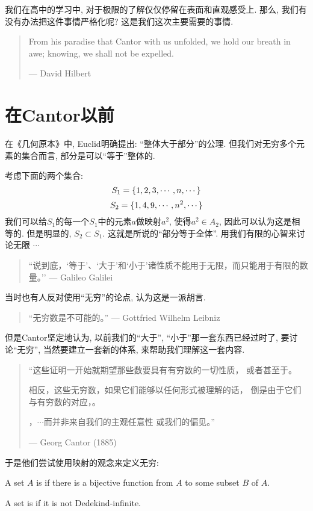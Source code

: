 我们在高中的学习中, 对于极限的了解仅仅停留在表面和直观感受上. 那么, 我们有没有办法把这件事情严格化呢? 这是我们这次主要需要的事情. 

\begin{quote}
    From his paradise that Cantor with us unfolded,
    we hold our breath in awe; knowing, we shall not be expelled.

    \hfill --- David Hilbert
\end{quote}

\section{在Cantor以前}

在《几何原本》中, Euclid明确提出: ``整体大于部分''的公理. 但我们对无穷多个元素的集合而言, 部分是可以``等于''整体的. 

考虑下面的两个集合: 
\[
S_1 = \{1, 2, 3, \cdots, n, \cdots\}
\]
\[
S_2 = \{1, 4, 9, \cdots, n^2, \cdots\}
\]
我们可以给$S_1$的每一个$S_1$中的元素$a$做映射$a^2$, 使得$a^2 \in A_2$, 因此可以认为这是相等的. 但是明显的, $S_2 \subset S_1$. 这就是所说的``部分等于全体''. 用我们有限的心智来讨论无限 $\cdots$

\begin{quote}
    ``说到底，`等于'、`大于'和`小于'诸性质不能用于无限，而只能用于有限的数量。'' 
    \hfill --- Galileo Galilei
\end{quote}

当时也有人反对使用``无穷''的论点, 认为这是一派胡言. 
\begin{quote}
    ``无穷数是不可能的。'' \hfill --- Gottfried Wilhelm Leibniz
\end{quote}

但是Cantor坚定地认为, 以前我们的``大于'', ``小于''那一套东西已经过时了, 要讨论``无穷'', 当然要建立一套新的体系, 来帮助我们理解这一套内容. 

\begin{quote}
    ``这些证明一开始就期望那些数要具有有穷数的一切性质，
    或者甚至于。

    相反，这些无穷数，如果它们能够以任何形式被理解的话，
    倒是由于它们与有穷数的对应，。

    ，$\cdots$而并非来自我们的主观任意性
    或我们的偏见。''

    \hfill --- Georg Cantor (1885)
\end{quote}

于是他们尝试使用映射的观念来定义无穷: 
\begin{definition}
    A set $A$ is 
    if there is a bijective function from $A$ to some  subset $B$ of $A$. 

    A set is  if it is not Dedekind-infinite.
\end{definition}

